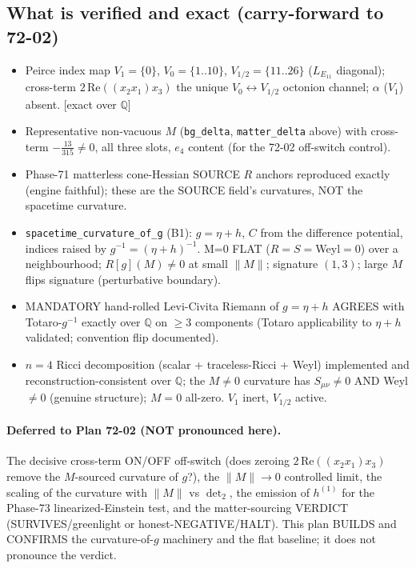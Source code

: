 \subsection{What is verified and exact (carry-forward to 72-02)}
\label{sec:carryforward}

\begin{itemize}
  \item Peirce index map $V_1=\{0\}$, $V_0=\{1..10\}$, $V_{1/2}=\{11..26\}$
        ($L_{E_{11}}$ diagonal); cross-term $2\,\mathrm{Re}((x_2x_1)x_3)$ the unique
        $V_0\!\leftrightarrow\!V_{1/2}$ octonion channel; $\alpha$ ($V_1$) absent.
        [exact over $\mathbb{Q}$]
  \item Representative non-vacuous $M$ (\texttt{bg\_delta}, \texttt{matter\_delta}
        above) with cross-term $-\tfrac{13}{315}\neq0$, all three slots, $e_4$ content
        (for the 72-02 off-switch control).
  \item Phase-71 matterless cone-Hessian SOURCE $R$ anchors reproduced exactly
        (engine faithful); these are the SOURCE field's curvatures, NOT the spacetime
        curvature.
  \item \texttt{spacetime\_curvature\_of\_g} (B1): $g=\eta+h$, $C$ from the difference
        potential, indices raised by $g^{-1}=(\eta+h)^{-1}$. M=0 FLAT
        ($R=S=$Weyl$=0$) over a neighbourhood; $R[g](M)\neq0$ at small $\|M\|$;
        signature $(1,3)$; large $M$ flips signature (perturbative boundary).
  \item MANDATORY hand-rolled Levi-Civita Riemann of $g=\eta+h$ AGREES with
        Totaro-$g^{-1}$ exactly over $\mathbb{Q}$ on $\geq3$ components (Totaro
        applicability to $\eta+h$ validated; convention flip documented).
  \item $n=4$ Ricci decomposition (scalar + traceless-Ricci + Weyl) implemented and
        reconstruction-consistent over $\mathbb{Q}$; the $M\neq0$ curvature has
        $S_{\mu\nu}\neq0$ AND Weyl$\neq0$ (genuine structure); $M=0$ all-zero. $V_1$
        inert, $V_{1/2}$ active.
\end{itemize}

\paragraph{Deferred to Plan 72-02 (NOT pronounced here).} The decisive cross-term
ON/OFF off-switch (does zeroing $2\,\mathrm{Re}((x_2x_1)x_3)$ remove the $M$-sourced
curvature of $g$?), the $\|M\|\to0$ controlled limit, the scaling of the curvature
with $\|M\|$ vs $\det_2$, the emission of $h^{(1)}$ for the Phase-73 linearized-Einstein
test, and the matter-sourcing VERDICT (SURVIVES/greenlight or honest-NEGATIVE/HALT).
This plan BUILDS and CONFIRMS the curvature-of-$g$ machinery and the flat baseline; it
does not pronounce the verdict.


